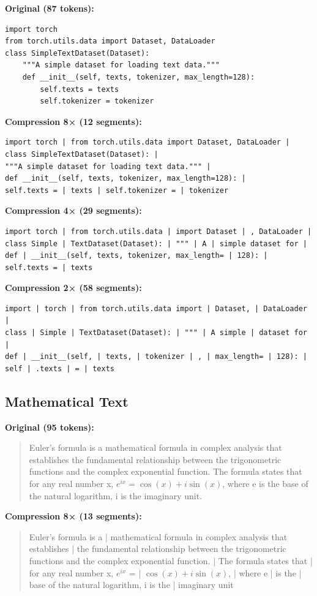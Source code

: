 \textbf{Original (87 tokens):}
\begin{verbatim}
import torch
from torch.utils.data import Dataset, DataLoader
class SimpleTextDataset(Dataset):
    """A simple dataset for loading text data."""
    def __init__(self, texts, tokenizer, max_length=128):
        self.texts = texts
        self.tokenizer = tokenizer
\end{verbatim}

\textbf{Compression 8× (12 segments):}
\begin{verbatim}
import torch | from torch.utils.data import Dataset, DataLoader | 
class SimpleTextDataset(Dataset): | 
"""A simple dataset for loading text data.""" | 
def __init__(self, texts, tokenizer, max_length=128): | 
self.texts = | texts | self.tokenizer = | tokenizer
\end{verbatim}

\textbf{Compression 4× (29 segments):}
\begin{verbatim}
import torch | from torch.utils.data | import Dataset | , DataLoader | 
class Simple | TextDataset(Dataset): | """ | A | simple dataset for | 
def | __init__(self, texts, tokenizer, max_length= | 128): | 
self.texts = | texts
\end{verbatim}

\textbf{Compression 2× (58 segments):}
\begin{verbatim}
import | torch | from torch.utils.data import | Dataset, | DataLoader | 
class | Simple | TextDataset(Dataset): | """ | A simple | dataset for | 
def | __init__(self, | texts, | tokenizer | , | max_length= | 128): | 
self | .texts | = | texts
\end{verbatim}

\subsection{Mathematical Text}

\textbf{Original (95 tokens):}
\begin{quote}
\small
Euler's formula is a mathematical formula in complex analysis that establishes the fundamental relationship between the trigonometric functions and the complex exponential function. The formula states that for any real number x, $e^{ix} = \cos(x) + i\sin(x)$, where e is the base of the natural logarithm, i is the imaginary unit.
\end{quote}

\textbf{Compression 8× (13 segments):}
\begin{quote}
\small
Euler's formula is a | mathematical formula in complex analysis that establishes | the fundamental relationship between the trigonometric functions and the complex exponential function. | The formula states that | for any real number x, $e^{ix}$ = | $\cos(x) + i\sin(x)$, | where e | is the | base of the natural logarithm, i is the | imaginary unit
\end{quote}

